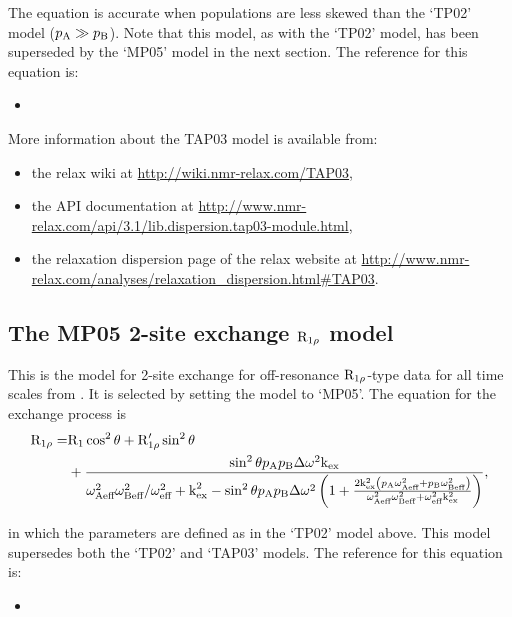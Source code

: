 The equation is accurate when populations are less skewed than the `TP02' model ($p_\textrm{A} \gg p_\textrm{B}$).
Note that this model, as with the `TP02' model, has been superseded by the `MP05' model in the next section.
The reference for this equation is:
\begin{itemize}
  \item {}
\end{itemize}

More information about the TAP03 model is available from:
\begin{itemize}
  \item the relax wiki at \url{http://wiki.nmr-relax.com/TAP03},
  \item the API documentation at \url{http://www.nmr-relax.com/api/3.1/lib.dispersion.tap03-module.html},
  \item the relaxation dispersion page of the relax website at \url{http://www.nmr-relax.com/analyses/relaxation\_dispersion.html#TAP03}.
\end{itemize}



\subsection{The MP05 2-site exchange $\mathrm{R}_{1\rho}$ model}
\label{sect: dispersion: MP05 model}

This is the model for 2-site exchange for off-resonance $\mathrm{R}_{1\rho}$-type data for all time scales from \citet{MiloushevPalmer05}.
It is selected by setting the model to `MP05'.
The equation for the exchange process is
\begin{align}
    \mathrm{R}_{1\rho} = & \mathrm{R}_1\cos^2\theta + \mathrm{R}_{1\rho}'\sin^2\theta \nonumber \\
               & + \frac{\sin^2\theta p_\textrm{A}p_\textrm{B}\Delta\omega^2\textrm{k}_\textrm{ex}}{\omega_\textrm{Aeff}^2\omega_\textrm{Beff}^2/\omega_\textrm{eff}^2 + \textrm{k}_\textrm{ex}^2 - \sin^2\theta p_\textrm{A}p_\textrm{B}\Delta\omega^2 \left(
                        1 + \frac{2\textrm{k}_\textrm{ex}^2 \left( p_\textrm{A}\omega_\textrm{Aeff}^2 + p_\textrm{B}\omega_\textrm{Beff}^2 \right)}{\omega_\textrm{Aeff}^2\omega_\textrm{Beff}^2 + \omega_\textrm{eff}^2\textrm{k}_\textrm{ex}^2}
                    \right)},
\end{align}

in which the parameters are defined as in the `TP02' model above.
This model supersedes both the `TP02' and `TAP03' models.
The reference for this equation is:
\begin{itemize}
  \item {}
\end{itemize}

